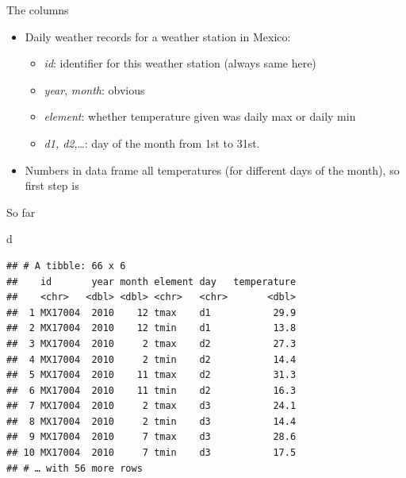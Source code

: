 \documentclass[ignorenonframetext,]{beamer}
\newenvironment{Shaded}{\begin{snugshade}}{\end{snugshade}}
\newcommand{\DataTypeTok}[1]{\textcolor[rgb]{0.13,0.29,0.53}{#1}}
\newcommand{\KeywordTok}[1]{\textcolor[rgb]{0.13,0.29,0.53}{\textbf{#1}}}
\newcommand{\NormalTok}[1]{#1}
\newcommand{\OperatorTok}[1]{\textcolor[rgb]{0.81,0.36,0.00}{\textbf{#1}}}
\newcommand{\StringTok}[1]{\textcolor[rgb]{0.31,0.60,0.02}{#1}}
\providecommand{\tightlist}{%
  \setlength{\itemsep}{0pt}\setlength{\parskip}{0pt}}
\begin{document}
\begin{frame}[fragile]{The columns}
\protect\hypertarget{the-columns}{}

\begin{itemize}
\item
  Daily weather records for a weather station in Mexico:

  \begin{itemize}
  \tightlist
  \item
    \emph{id}: identifier for this weather station (always same here)
  \item
    \emph{year}, \emph{month}: obvious
  \item
    \emph{element}: whether temperature given was daily max or daily min
  \item
    \emph{d1, d2},\ldots{}: day of the month from 1st to 31st.
  \end{itemize}
\item
  Numbers in data frame all temperatures (for different days of the
  month), so first step is
\end{itemize}

\begin{Shaded}
\end{Shaded}

\end{frame}

\begin{frame}[fragile]{So far}
\protect\hypertarget{so-far}{}

\begin{Shaded}
\begin{Highlighting}[]
\NormalTok{d}
\end{Highlighting}
\end{Shaded}

\begin{verbatim}
## # A tibble: 66 x 6
##    id       year month element day   temperature
##    <chr>   <dbl> <dbl> <chr>   <chr>       <dbl>
##  1 MX17004  2010    12 tmax    d1           29.9
##  2 MX17004  2010    12 tmin    d1           13.8
##  3 MX17004  2010     2 tmax    d2           27.3
##  4 MX17004  2010     2 tmin    d2           14.4
##  5 MX17004  2010    11 tmax    d2           31.3
##  6 MX17004  2010    11 tmin    d2           16.3
##  7 MX17004  2010     2 tmax    d3           24.1
##  8 MX17004  2010     2 tmin    d3           14.4
##  9 MX17004  2010     7 tmax    d3           28.6
## 10 MX17004  2010     7 tmin    d3           17.5
## # … with 56 more rows
\end{verbatim}

\end{frame}
\end{document}
